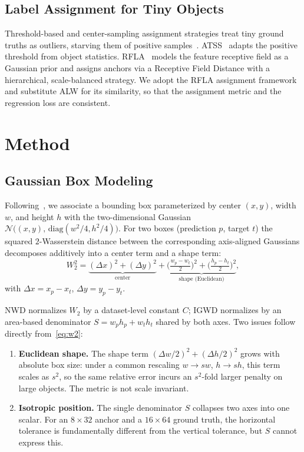 \documentclass[journal]{IEEEtran}
\begin{document}
\subsection{Label Assignment for Tiny Objects}

Threshold-based and center-sampling assignment strategies treat tiny ground
truths as outliers, starving them of positive
samples~\cite{xu2022rfla}. ATSS~\cite{zhang2020atss} adapts the positive
threshold from object statistics. RFLA~\cite{xu2022rfla} models the feature
receptive field as a Gaussian prior and assigns anchors via a Receptive Field
Distance with a hierarchical, scale-balanced strategy. We adopt the RFLA
assignment framework and substitute ALW for its similarity, so that the
assignment metric and the regression loss are consistent.

\section{Method}
\label{sec:method}

\subsection{Gaussian Box Modeling}

Following~\cite{wang2021nwd}, we associate a bounding box parameterized by
center $(x,y)$, width $w$, and height $h$ with the two-dimensional Gaussian
$\mathcal{N}\!\big((x,y),\,\mathrm{diag}(w^2/4,h^2/4)\big)$. For two boxes
(prediction $p$, target $t$) the squared $2$-Wasserstein distance between the
corresponding axis-aligned Gaussians decomposes additively into a center term
and a shape term:
\begin{equation}
W_2^2 = \underbrace{(\Delta x)^2 + (\Delta y)^2}_{\text{center}} +
        \underbrace{\Big(\tfrac{w_p-w_t}{2}\Big)^2 + \Big(\tfrac{h_p-h_t}{2}\Big)^2}_{\text{shape (Euclidean)}},
\label{eq:w2}
\end{equation}
with $\Delta x = x_p-x_t$, $\Delta y = y_p-y_t$.

NWD normalizes $W_2$ by a dataset-level constant $C$; IGWD normalizes by an
area-based denominator $S = w_p h_p + w_t h_t$ shared by both axes. Two issues
follow directly from~\eqref{eq:w2}:
\begin{enumerate}
  \item \textbf{Euclidean shape.} The shape term $(\Delta w/2)^2+(\Delta
  h/2)^2$ grows with absolute box size: under a common rescaling $w\to
  sw$, $h\to sh$, this term scales as $s^2$, so the same relative error
  incurs an $s^2$-fold larger penalty on large objects. The metric is not scale
  invariant.
  \item \textbf{Isotropic position.} The single denominator $S$ collapses two
  axes into one scalar. For an $8\times32$ anchor and a $16\times64$ ground
  truth, the horizontal tolerance is fundamentally different from the vertical
  tolerance, but $S$ cannot express this.
\end{enumerate}
\end{document}
